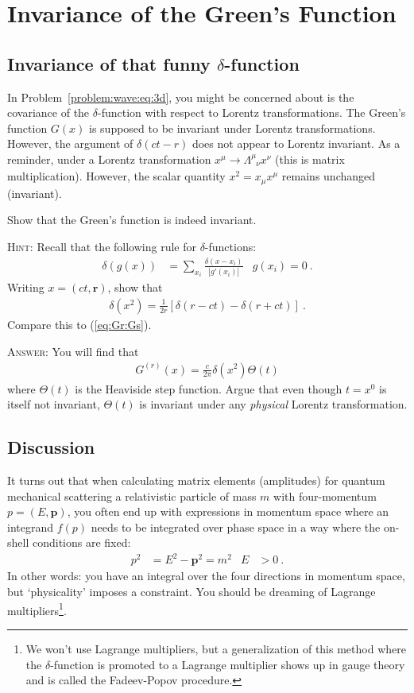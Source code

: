 \documentclass[12pt]{article}
\numberwithin{equation}{section}    %
\renewcommand{\vec}[1]{\mathbf{#1}} %
\begin{document}
\section{Invariance of the Green's Function}

\subsection{Invariance of that funny $\delta$-function}

In Problem~\ref{problem:wave:eq:3d}, you might be concerned about is the covariance of the $\delta$-function with respect to Lorentz transformations. The Green's function $G(x)$ is supposed to be invariant under Lorentz transformations. However, the argument of $\delta(ct - r)$ does not appear to Lorentz invariant. As a reminder, under a Lorentz transformation $x^\mu \to \Lambda^\mu_{\phantom\mu\nu}x^\nu$ (this is matrix multiplication). However, the scalar quantity $x^2 = x_\mu x^\mu$ remains unchanged (invariant).

Show that the Green's function is indeed invariant.


\textsc{Hint:} Recall that the following rule for $\delta$-functions:
\begin{align}
	\delta\left(g(x)\right) &= \sum_{x_i} \frac{\delta(x-x_i)}{|g'(x_i)|}
	&
	g(x_i) = 0 \ .
\end{align}
Writing $x = (ct,\vec r)$, show that
\begin{align}
	\delta(x^2) = \frac{1}{2r} \left[
	\delta(r-ct) - \delta(r+ct)
	\right] \ .
\end{align}
Compare this to (\ref{eq:Gr:Gs}). 

\textsc{Answer}: You will find that 
\begin{align}
	G^{(r)}(x) = \frac{c}{2\pi} \delta(x^2) \Theta(t)
\end{align}
where $\Theta(t)$ is the Heaviside step function. Argue that even though $t=x^0$ is itself not invariant, $\Theta(t)$ is invariant under any \emph{physical} Lorentz transformation. 


\subsection{Discussion}
It turns out that when calculating matrix elements (amplitudes) for quantum mechanical scattering a relativistic particle of mass $m$ with four-momentum $p = (E,\vec p)$, you often end up with expressions in momentum space where an integrand $f(p)$ needs to be integrated over phase space in a way where the on-shell conditions are fixed:
\begin{align}
	p^2 &= E^2 - \vec p^2 = m^2 
	&
	E &>0
	\ .
\end{align}
In other words: you have an integral over the four directions in momentum space, but `physicality' imposes a constraint. You should be dreaming of Lagrange multipliers\footnote{We won't use Lagrange multipliers, but a generalization of this method where the $\delta$-function is promoted to a Lagrange multiplier shows up in gauge theory and is called the Fadeev-Popov procedure.}. 
\end{document}

